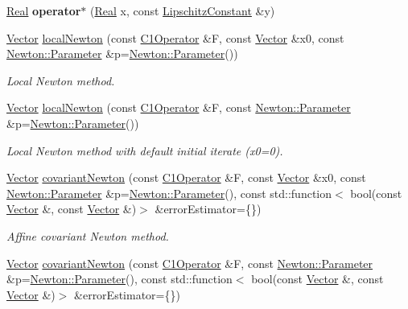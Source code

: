 \begin{DoxyCompactItemize}
\item 
\hypertarget{namespaceSpacy_af2f966e1b7480cdbd9ac1d9efc5b32f3}{\hyperlink{classSpacy_1_1Real}{Real} {\bfseries operator$\ast$} (\hyperlink{classSpacy_1_1Real}{Real} x, const \hyperlink{classSpacy_1_1LipschitzConstant}{Lipschitz\-Constant} \&y)}\label{namespaceSpacy_af2f966e1b7480cdbd9ac1d9efc5b32f3}

\item 
\hyperlink{classSpacy_1_1Vector}{Vector} \hyperlink{group__NewtonGroup_ga448b8e78b2e84ed78e70c42114ea7599}{local\-Newton} (const \hyperlink{classSpacy_1_1C1Operator}{C1\-Operator} \&F, const \hyperlink{classSpacy_1_1Vector}{Vector} \&x0, const \hyperlink{structSpacy_1_1Newton_1_1Parameter}{Newton\-::\-Parameter} \&p=\hyperlink{structSpacy_1_1Newton_1_1Parameter}{Newton\-::\-Parameter}())
\begin{DoxyCompactList}\small\item\em Local Newton method. \end{DoxyCompactList}\item 
\hyperlink{classSpacy_1_1Vector}{Vector} \hyperlink{group__NewtonGroup_gafbe5e25f46f7b0d237f5e9971cef998a}{local\-Newton} (const \hyperlink{classSpacy_1_1C1Operator}{C1\-Operator} \&F, const \hyperlink{structSpacy_1_1Newton_1_1Parameter}{Newton\-::\-Parameter} \&p=\hyperlink{structSpacy_1_1Newton_1_1Parameter}{Newton\-::\-Parameter}())
\begin{DoxyCompactList}\small\item\em Local Newton method with default initial iterate (x0=0). \end{DoxyCompactList}\item 
\hyperlink{classSpacy_1_1Vector}{Vector} \hyperlink{group__NewtonGroup_ga6c18ad252cb530e4f6734eb4e4fda481}{covariant\-Newton} (const \hyperlink{classSpacy_1_1C1Operator}{C1\-Operator} \&F, const \hyperlink{classSpacy_1_1Vector}{Vector} \&x0, const \hyperlink{structSpacy_1_1Newton_1_1Parameter}{Newton\-::\-Parameter} \&p=\hyperlink{structSpacy_1_1Newton_1_1Parameter}{Newton\-::\-Parameter}(), const std\-::function$<$ bool(const \hyperlink{classSpacy_1_1Vector}{Vector} \&, const \hyperlink{classSpacy_1_1Vector}{Vector} \&)$>$ \&error\-Estimator=\{\})
\begin{DoxyCompactList}\small\item\em Affine covariant Newton method. \end{DoxyCompactList}\item 
\hyperlink{classSpacy_1_1Vector}{Vector} \hyperlink{group__NewtonGroup_ga2d469322482680319bf81d865ed57068}{covariant\-Newton} (const \hyperlink{classSpacy_1_1C1Operator}{C1\-Operator} \&F, const \hyperlink{structSpacy_1_1Newton_1_1Parameter}{Newton\-::\-Parameter} \&p=\hyperlink{structSpacy_1_1Newton_1_1Parameter}{Newton\-::\-Parameter}(), const std\-::function$<$ bool(const \hyperlink{classSpacy_1_1Vector}{Vector} \&, const \hyperlink{classSpacy_1_1Vector}{Vector} \&)$>$ \&error\-Estimator=\{\})

\end{DoxyCompactItemize}
